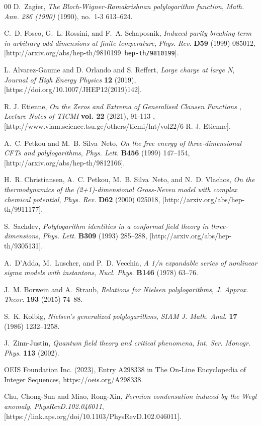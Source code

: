 \documentclass[twoside]{article}
\begin{document}
\begin{thebibliography}{00}
D.~Zagier, {\it {The Bloch-Wigner-Ramakrishnan polylogarithm function}}, {\em Math. Ann. 286 (1990)} (1990), no.~1-3 613--624.

C.~D. Fosco, G.~L. Rossini, and F.~A. Schaposnik, {\it {Induced parity breaking term in arbitrary odd dimensions at finite temperature}},  {\em Phys. Rev.} {\bf D59} (1999) 085012, [{http://arxiv.org/abs/hep-th/9810199}{{\tt
hep-th/9810199}}].

L. Alvarez-Gaume and D. Orlando and S. Reffert, {\it Large charge at large N}, {\em Journal of High Energy Physics} {\bf 12} (2019), [{https://doi.org/10.1007/JHEP12(2019)142}].

R. J. Etienne, {\it {On the Zeros and Extrema of Generalised Clausen Functions }}, {\em Lecture Notes of  TICMI} {\bf vol. 22} (2021), 91-113 ,
  [{http://www.viam.science.tsu.ge/others/ticmi/lnt/vol22/6-R. J. Etienne}].


A.~C. Petkou and M.~B. Silva~Neto, {\it {On the free energy of three-dimensional CFTs and polylogarithms}}, {\em Phys. Lett.} {\bf B456} (1999) 147--154, [{http://arxiv.org/abs/hep-th/9812166}].

H.~R. Christiansen, A.~C. Petkou, M.~B. Silva~Neto, and N.~D. Vlachos, {\it {On
  the thermodynamics of the (2+1)-dimensional Gross-Neveu model with complex
  chemical potential}}, {\em Phys. Rev.} {\bf D62} (2000) 025018,
  [{http://arxiv.org/abs/hep-th/9911177}].


S.~Sachdev, {\it {Polylogarithm identities in a conformal field theory in three-dimensions}}, {\em Phys. Lett.} {\bf B309} (1993) 285--288, [{http://arxiv.org/abs/hep-th/9305131}].


A.~D'Adda, M.~Luscher, and P.~D. Vecchia, {\it A 1/n expandable series of nonlinear sigma models with instantons}, {\em Nucl. Phys.} {\bf B146} (1978)
  63--76.

J.~M. Borwein and A.~Straub, {\it {Relations for Nielsen polylogarithms}}, {\em J. Approx. Theor.} {\bf 193} (2015) 74--88.

S.~K. Kolbig, {\it Nielsen's generalized polylogarithms}, {\em SIAM J. Math. Anal.} {\bf 17} (1986) 1232--1258.

J.~Zinn-Justin, {\it {Quantum field theory and critical phenomena}},  {\em Int. Ser. Monogr. Phys.} {\bf 113} (2002).

OEIS Foundation Inc. (2023), Entry A298338 in The On-Line Encyclopedia of Integer Sequences, https://oeis.org/A298338.

Chu, Chong-Sun and Miao, Rong-Xin, {\it {Fermion condensation induced by the Weyl anomaly}}, {\em PhysRevD.102.046011}, [{https://link.aps.org/doi/10.1103/PhysRevD.102.046011}].


 
\end{thebibliography}
\end{document}
